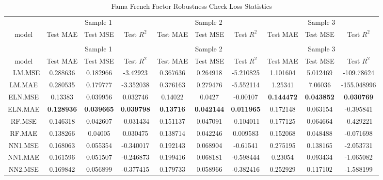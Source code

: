 \begingroup\fontsize{6}{8}\selectfont

\begin{longtable}[t]{cccccccccc}
\caption{\label{tab:}Fama French Factor Robustness Check Loss Statistics}\\
\toprule
\multicolumn{1}{c}{ } & \multicolumn{3}{c}{Sample 1} & \multicolumn{3}{c}{Sample 2} & \multicolumn{3}{c}{Sample 3} \\
\cmidrule(l{3pt}r{3pt}){2-4} \cmidrule(l{3pt}r{3pt}){5-7} \cmidrule(l{3pt}r{3pt}){8-10}
model & Test MAE & Test MSE & Test $R^2$ & Test MAE & Test MSE & Test $R^2$ & Test MAE & Test MSE & Test $R^2$\\
\midrule
\endfirsthead
\caption[]{Fama French Factor Robustness Check Loss Statistics }\\
\toprule
\multicolumn{1}{c}{ } & \multicolumn{3}{c}{Sample 1} & \multicolumn{3}{c}{Sample 2} & \multicolumn{3}{c}{Sample 3} \\
\cmidrule(l{3pt}r{3pt}){2-4} \cmidrule(l{3pt}r{3pt}){5-7} \cmidrule(l{3pt}r{3pt}){8-10}
model & Test MAE & Test MSE & Test $R^2$ & Test MAE & Test MSE & Test $R^2$ & Test MAE & Test MSE & Test $R^2$\\
\midrule
\endhead
\
\endfoot
\bottomrule
\endlastfoot
LM.MSE & 0.288636 & 0.182966 & -3.42923 & 0.367636 & 0.264918 & -5.210825 & 1.101604 & 5.012469 & -109.78624\\
LM.MAE & 0.280535 & 0.179777 & -3.352038 & 0.376163 & 0.279476 & -5.552114 & 1.25341 & 7.06036 & -155.048996\\
ELN.MSE & 0.13383 & 0.039956 & 0.032746 & 0.14022 & 0.0427 & -0.00107 & \textbf{0.144472} & \textbf{0.043852} & \textbf{0.030769}\\
ELN.MAE & \textbf{0.128936} & \textbf{0.039665} & \textbf{0.039798} & \textbf{0.13716} & \textbf{0.042144} & \textbf{0.011965} & 0.172148 & 0.063154 & -0.395841\\
RF.MSE & 0.146318 & 0.042607 & -0.031434 & 0.151137 & 0.047091 & -0.104011 & 0.177125 & 0.064664 & -0.429221\\
RF.MAE & 0.138266 & 0.04005 & 0.030475 & 0.138714 & 0.042246 & 0.009583 & 0.152068 & 0.048488 & -0.071698\\
NN1.MSE & 0.168063 & 0.055354 & -0.340017 & 0.192143 & 0.068904 & -0.61541 & 0.275195 & 0.138165 & -2.053731\\
NN1.MAE & 0.161596 & 0.051507 & -0.246873 & 0.199416 & 0.068181 & -0.598444 & 0.23054 & 0.093434 & -1.065082\\
NN2.MSE & 0.169842 & 0.056899 & -0.377415 & 0.179733 & 0.058966 & -0.382416 & 0.252929 & 0.117102 & -1.588199\\

\end{longtable}
